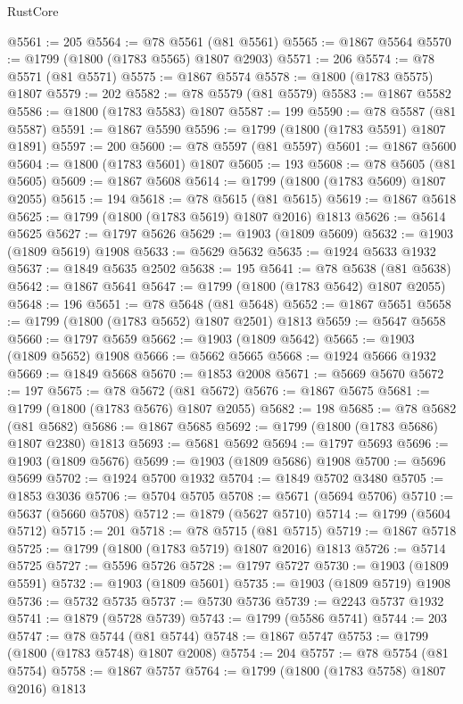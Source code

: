 \begin{lexlean}{RustCore}
\begin{coremodule}
@5561 := 205
@5564 := @78 @5561 (@81 @5561)
@5565 := @1867 @5564
@5570 := @1799 (@1800 (@1783 @5565) @1807 @2903)
@5571 := 206
@5574 := @78 @5571 (@81 @5571)
@5575 := @1867 @5574
@5578 := @1800 (@1783 @5575) @1807
@5579 := 202
@5582 := @78 @5579 (@81 @5579)
@5583 := @1867 @5582
@5586 := @1800 (@1783 @5583) @1807
@5587 := 199
@5590 := @78 @5587 (@81 @5587)
@5591 := @1867 @5590
@5596 := @1799 (@1800 (@1783 @5591) @1807 @1891)
@5597 := 200
@5600 := @78 @5597 (@81 @5597)
@5601 := @1867 @5600
@5604 := @1800 (@1783 @5601) @1807
@5605 := 193
@5608 := @78 @5605 (@81 @5605)
@5609 := @1867 @5608
@5614 := @1799 (@1800 (@1783 @5609) @1807 @2055)
@5615 := 194
@5618 := @78 @5615 (@81 @5615)
@5619 := @1867 @5618
@5625 := @1799 (@1800 (@1783 @5619) @1807 @2016) @1813
@5626 := @5614 @5625
@5627 := @1797 @5626
@5629 := @1903 (@1809 @5609)
@5632 := @1903 (@1809 @5619) @1908
@5633 := @5629 @5632
@5635 := @1924 @5633 @1932
@5637 := @1849 @5635 @2502
@5638 := 195
@5641 := @78 @5638 (@81 @5638)
@5642 := @1867 @5641
@5647 := @1799 (@1800 (@1783 @5642) @1807 @2055)
@5648 := 196
@5651 := @78 @5648 (@81 @5648)
@5652 := @1867 @5651
@5658 := @1799 (@1800 (@1783 @5652) @1807 @2501) @1813
@5659 := @5647 @5658
@5660 := @1797 @5659
@5662 := @1903 (@1809 @5642)
@5665 := @1903 (@1809 @5652) @1908
@5666 := @5662 @5665
@5668 := @1924 @5666 @1932
@5669 := @1849 @5668
@5670 := @1853 @2008
@5671 := @5669 @5670
@5672 := 197
@5675 := @78 @5672 (@81 @5672)
@5676 := @1867 @5675
@5681 := @1799 (@1800 (@1783 @5676) @1807 @2055)
@5682 := 198
@5685 := @78 @5682 (@81 @5682)
@5686 := @1867 @5685
@5692 := @1799 (@1800 (@1783 @5686) @1807 @2380) @1813
@5693 := @5681 @5692
@5694 := @1797 @5693
@5696 := @1903 (@1809 @5676)
@5699 := @1903 (@1809 @5686) @1908
@5700 := @5696 @5699
@5702 := @1924 @5700 @1932
@5704 := @1849 @5702 @3480
@5705 := @1853 @3036
@5706 := @5704 @5705
@5708 := @5671 (@5694 @5706)
@5710 := @5637 (@5660 @5708)
@5712 := @1879 (@5627 @5710)
@5714 := @1799 (@5604 @5712)
@5715 := 201
@5718 := @78 @5715 (@81 @5715)
@5719 := @1867 @5718
@5725 := @1799 (@1800 (@1783 @5719) @1807 @2016) @1813
@5726 := @5714 @5725
@5727 := @5596 @5726
@5728 := @1797 @5727
@5730 := @1903 (@1809 @5591)
@5732 := @1903 (@1809 @5601)
@5735 := @1903 (@1809 @5719) @1908
@5736 := @5732 @5735
@5737 := @5730 @5736
@5739 := @2243 @5737 @1932
@5741 := @1879 (@5728 @5739)
@5743 := @1799 (@5586 @5741)
@5744 := 203
@5747 := @78 @5744 (@81 @5744)
@5748 := @1867 @5747
@5753 := @1799 (@1800 (@1783 @5748) @1807 @2008)
@5754 := 204
@5757 := @78 @5754 (@81 @5754)
@5758 := @1867 @5757
@5764 := @1799 (@1800 (@1783 @5758) @1807 @2016) @1813

\end{coremodule}
\end{lexlean}
